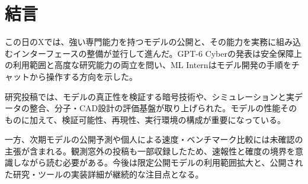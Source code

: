 \section{結言}
この日のXでは、強い専門能力を持つモデルの公開と、その能力を実務に組み込むインターフェースの整備が並行して進んだ。GPT-6 Cyberの発表は安全保障上の利用範囲と高度な研究能力の両立を問い、ML Internはモデル開発の手順をチャットから操作する方向を示した。

研究投稿では、モデルの真正性を検証する暗号技術や、シミュレーションと実データの整合、分子・CAD設計の評価基盤が取り上げられた。モデルの性能そのものに加えて、検証可能性、再現性、実行環境の構成が重要になっている。

一方、次期モデルの公開予測や個人による速度・ベンチマーク比較には未確認の主張が含まれる。観測窓外の投稿も一部収録したため、速報性と確度の境界を意識しながら読む必要がある。今後は限定公開モデルの利用範囲拡大と、公開された研究・ツールの実装詳細が継続的な注目点となる。
